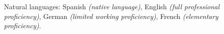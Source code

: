 \documentclass[10pt,a4paper]{article} %
\begin{document}

\inlineheadsection %
{Natural languages:}
{Spanish \textit{(native language)}, English \textit{(full professional proficiency)}, German \textit{(limited working proficiency)}, French \textit{(elementary proficiency)}.}

\end{document}
